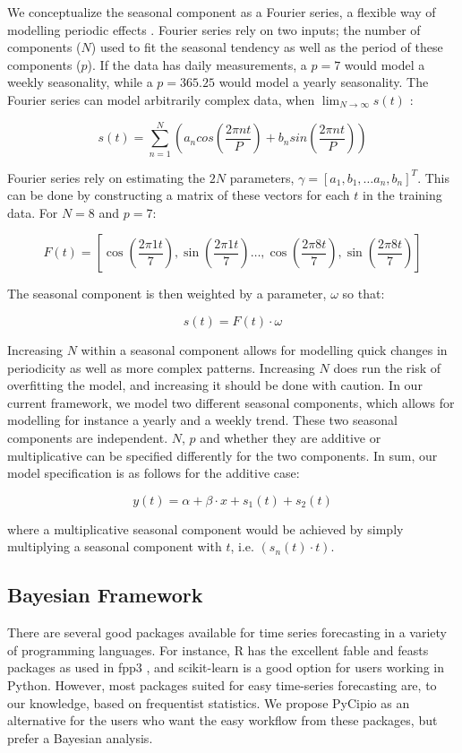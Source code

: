 \documentclass{article}
\begin{document}
We conceptualize the seasonal component as a Fourier series, a flexible way of modelling periodic effects \cite{taylor2018forecasting}. Fourier series rely on two inputs; the number of components ($N$) used to fit the seasonal tendency as well as the period of these components ($p$). If the data has daily measurements, a $p = 7$ would model a weekly seasonality, while a $p = 365.25$ would model a yearly seasonality. The Fourier series can model arbitrarily complex data, when $\lim_{N\to\infty} s(t)$ \cite{taylor2018forecasting}:

$$s(t) = \sum _{n=1} ^N \left( a_n cos(\frac{2 \pi n t}{P}) + b_n sin(\frac{2 \pi n t}{P}) \right)$$

Fourier series rely on estimating the $2N$ parameters, $\gamma = [a_1, b_1, … a_n, b_n]^T$. This can be done by constructing a matrix of these vectors for each $t$ in the training data. For $N = 8$ and $p = 7$:

$$F(t) = \left[ \cos(\frac{2 \pi 1 t}{7}), \sin(\frac{2 \pi 1 t}{7}) \dots, \cos(\frac{2 \pi 8 t}{7}), \sin(\frac{2 \pi 8 t}{7}) \right]$$

The seasonal component is then weighted by a parameter, $\omega$ so that:

$$s(t) = F(t) \cdot \omega$$

Increasing $N$ within a seasonal component allows for modelling quick changes in periodicity as well as more complex patterns. Increasing $N$ does run the risk of overfitting the model, and increasing it should be done with caution. In our current framework, we model two different seasonal components, which allows for modelling for instance a yearly and a weekly trend. These two seasonal components are independent. $N$, $p$ and whether they are additive or multiplicative can be specified differently for the two components. In sum, our model specification is as follows for the additive case:

$$y(t) = \alpha + \beta \cdot x + s_1(t) + s_2(t)$$

where a multiplicative seasonal component would be achieved by simply multiplying a seasonal component with $t$, i.e. $(s_n(t) \cdot t)$.


\subsection{Bayesian Framework}

There are several good packages available for time series forecasting in a variety of programming languages. For instance, R has the excellent fable and feasts packages \cite{fable_package, feasts_package} as used in fpp3 \cite{fpp3}, and scikit-learn \cite{scikit-learn} is a good option for users working in Python. However, most packages suited for easy time-series forecasting are, to our knowledge, based on frequentist statistics. We propose PyCipio as an alternative for the users who want the easy workflow from these packages, but prefer a Bayesian analysis.   
\end{document}
